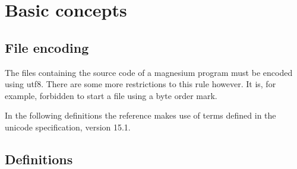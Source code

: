 \section{Basic concepts}

\subsection{File encoding}

The files containing the source code of a magnesium program must be encoded
using utf8. There are some more restrictions to this rule however. It is, for 
example, forbidden to start a file using a byte order mark.

In the following definitions the reference makes use of terms defined in the
unicode specification, version 15.1.

\subsection{Definitions}

